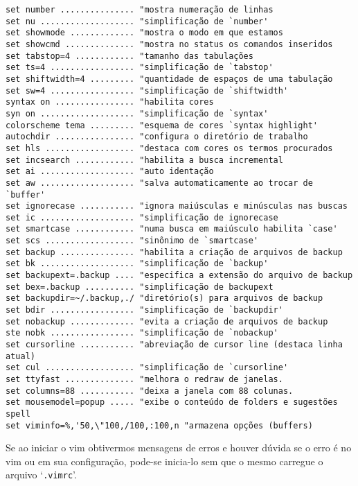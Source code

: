 \begin{verbatim}
set number ............... "mostra numeração de linhas
set nu ................... "simplificação de `number'
set showmode ............. "mostra o modo em que estamos
set showcmd .............. "mostra no status os comandos inseridos
set tabstop=4 ............ "tamanho das tabulações
set ts=4 ................. "simplificação de `tabstop'
set shiftwidth=4 ......... "quantidade de espaços de uma tabulação
set sw=4 ................. "simplificação de `shiftwidth'
syntax on ................ "habilita cores
syn on ................... "simplificação de `syntax'
colorscheme tema ......... "esquema de cores `syntax highlight'
autochdir ................ "configura o diretório de trabalho
set hls .................. "destaca com cores os termos procurados
set incsearch ............ "habilita a busca incremental
set ai ................... "auto identação
set aw ................... "salva automaticamente ao trocar de `buffer'
set ignorecase ........... "ignora maiúsculas e minúsculas nas buscas
set ic ................... "simplificação de ignorecase
set smartcase ............ "numa busca em maiúsculo habilita `case'
set scs .................. "sinônimo de `smartcase'
set backup ............... "habilita a criação de arquivos de backup
set bk ................... "simplificação de `backup'
set backupext=.backup .... "especifica a extensão do arquivo de backup
set bex=.backup .......... "simplificação de backupext
set backupdir=~/.backup,./ "diretório(s) para arquivos de backup
set bdir ................. "simplificação de `backupdir'
set nobackup ............. "evita a criação de arquivos de backup
ste nobk ................. "simplificação de `nobackup'
set cursorline ........... "abreviação de cursor line (destaca linha atual)
set cul .................. "simplificação de `cursorline'
set ttyfast .............. "melhora o redraw de janelas.
set columns=88 ........... "deixa a janela com 88 colunas.
set mousemodel=popup ..... "exibe o conteúdo de folders e sugestões spell
set viminfo=%,'50,\"100,/100,:100,n "armazena opções (buffers)
\end{verbatim}


{\Large {}} Se ao iniciar o vim obtivermos mensagens de erros
e houver dúvida se o erro é no vim ou em sua configuração, pode-se
inicia-lo sem que o mesmo carregue o arquivo 
`\texttt{.vimrc}'.  

